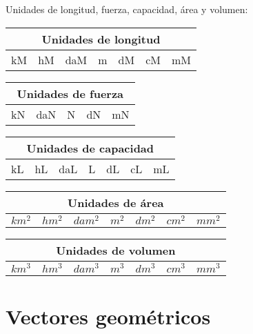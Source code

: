 Unidades de longitud, fuerza, capacidad, área y volumen:
\begin{center}
    \begin{tabular}{|c|c|c|c|c|c|c|}
        \hline
        \multicolumn{7}{|c|}{\textbf{Unidades de longitud}}\\
        \hline
        kM & hM & daM & m & dM & cM & mM \\
        \hline
    \end{tabular}
    \vspace{0.5cm}
    \begin{tabular}{|c|c|c|c|c|}
        \hline
        \multicolumn{5}{|c|}{\textbf{Unidades de fuerza}}\\
        \hline
        kN & daN & N & dN & mN \\
        \hline
    \end{tabular}
    \vspace{0.5cm}
    \begin{tabular}{|c|c|c|c|c|c|c|}
        \hline
        \multicolumn{7}{|c|}{\textbf{Unidades de capacidad}}\\
        \hline
        kL & hL & daL & L & dL & cL & mL \\
        \hline
    \end{tabular}
    \vspace{0.5cm}
    \begin{tabular}{|c|c|c|c|c|c|c|}
        \hline
        \multicolumn{7}{|c|}{\textbf{Unidades de área}}\\
        \hline
        $km^2$ & $hm^2$ & $dam^2$ & $m^2$ & $dm^2$ & $cm^2$ & $mm^2$ \\
        \hline
    \end{tabular}
    \vspace{0.5cm}
    \begin{tabular}{|c|c|c|c|c|c|c|}
        \hline
        \multicolumn{7}{|c|}{\textbf{Unidades de volumen}}\\
        \hline
        $km^3$ & $hm^3$ & $dam^3$ & $m^3$ & $dm^3$ & $cm^3$ & $mm^3$ \\
        \hline
    \end{tabular}
\end{center}

\section{Vectores geométricos}


